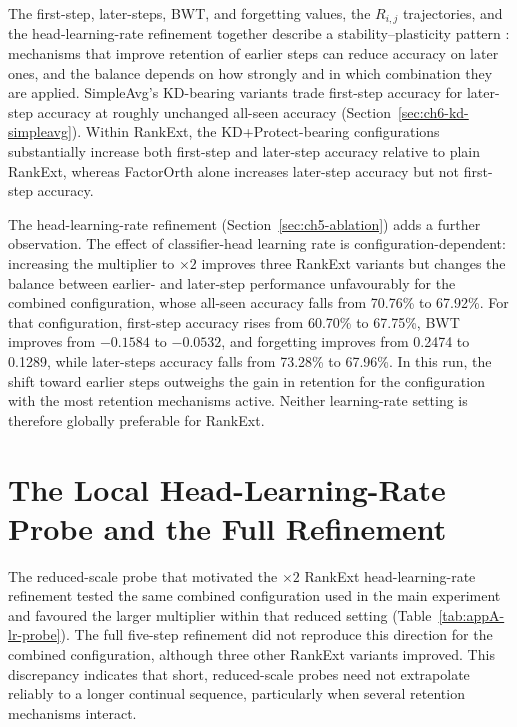 The first-step, later-steps, BWT, and forgetting values, the $R_{i,j}$
trajectories, and the head-learning-rate refinement together describe a
stability--plasticity pattern
\parencite{kirkpatrick2017overcoming,delange2022continual}: mechanisms that
improve retention of earlier steps can reduce accuracy on later ones, and
the balance depends on how strongly and in which combination they are
applied. SimpleAvg's KD-bearing variants trade first-step accuracy for
later-step accuracy at roughly unchanged all-seen accuracy
(Section~\ref{sec:ch6-kd-simpleavg}). Within RankExt, the KD+Protect-bearing
configurations substantially increase both first-step and later-step
accuracy relative to plain RankExt, whereas FactorOrth alone increases
later-step accuracy but not first-step accuracy.

The head-learning-rate refinement (Section~\ref{sec:ch5-ablation}) adds a
further observation. The effect of classifier-head learning rate is
configuration-dependent: increasing the multiplier to $\times2$ improves
three RankExt variants but changes the balance between earlier- and
later-step performance unfavourably for the combined configuration, whose
all-seen accuracy falls from 70.76\% to 67.92\%. For that configuration,
first-step accuracy rises from 60.70\% to 67.75\%, BWT improves from
$-0.1584$ to $-0.0532$, and forgetting improves from 0.2474 to 0.1289, while
later-steps accuracy falls from 73.28\% to 67.96\%. In this run, the shift
toward earlier steps outweighs the gain in retention for the configuration
with the most retention mechanisms active. Neither learning-rate setting is
therefore globally preferable for RankExt.

\section{The Local Head-Learning-Rate Probe and the Full Refinement}
\label{sec:ch6-lr-probe}

The reduced-scale probe that motivated the $\times2$ RankExt
head-learning-rate refinement tested the same combined configuration used
in the main experiment and favoured the larger multiplier within that
reduced setting (Table~\ref{tab:appA-lr-probe}). The full five-step
refinement did not reproduce this direction for the combined configuration,
although three other RankExt variants improved. This discrepancy indicates
that short, reduced-scale probes need not extrapolate reliably to a longer
continual sequence, particularly when several retention mechanisms
interact.


